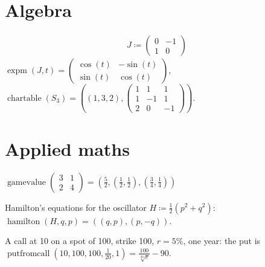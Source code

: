 \documentclass[11pt,a4paper]{article}
\theoremstyle{plain}
\theoremstyle{definition}
\theoremstyle{remark}
\begin{document}
\section*{Algebra}

\begin{align*}
  J \coloneqq  \begin{pmatrix} 0 & -1 \\ 1 & 0 \end{pmatrix}
\end{align*}
$\operatorname{expm}(J, t) = \begin{pmatrix} \cos\left(t\right) & -\sin\left(t\right) \\ \sin\left(t\right) & \cos\left(t\right) \end{pmatrix}$, $\operatorname{chartable}(S_3) = \left(\left(1, 3, 2\right), \begin{pmatrix} 1 & 1 & 1 \\ 1 & -1 & 1 \\ 2 & 0 & -1 \end{pmatrix}\right)$.

\section*{Applied maths}

$\operatorname{gamevalue}\begin{pmatrix} 3 & 1 \\ 2 & 4 \end{pmatrix} = \left(\frac{5}{2}, \left(\frac{1}{2}, \frac{1}{2}\right), \left(\frac{3}{4}, \frac{1}{4}\right)\right)$

Hamilton's equations for the oscillator $H \coloneqq  \tfrac12(p^2 + q^2)$: $\operatorname{hamilton}(H, q, p) = \left(\left(q, p\right), \left(p, -q\right)\right)$.

A call at 10 on a spot of 100, strike 100, $r = 5\%$, one year: the put is $\operatorname{putfromcall}(10, 100, 100, \tfrac1{20}, 1) = \frac{100}{\sqrt[20]{e}} - 90$.
\end{document}
